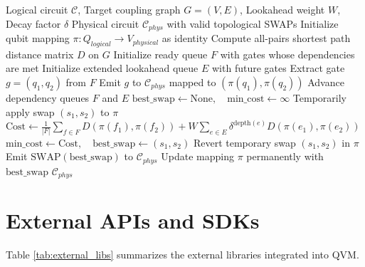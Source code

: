 \begin{algorithm}[H]
\caption{SABRE Routing with Decay-Weighted Lookahead}
\label{alg:sabre}
\begin{algorithmic}[1]
\Require Logical circuit $\mathcal{C}$, Target coupling graph $G=(V, E)$, Lookahead weight $W$, Decay factor $\delta$
\Ensure Physical circuit $\mathcal{C}_{phys}$ with valid topological SWAPs
\State Initialize qubit mapping $\pi: Q_{logical} \to V_{physical}$ as identity
\State Compute all-pairs shortest path distance matrix $D$ on $G$
\State Initialize ready queue $F$ with gates whose dependencies are met
\State Initialize extended lookahead queue $E$ with future gates
    \State Extract gate $g = (q_1, q_2)$ from $F$
        \State Emit $g$ to $\mathcal{C}_{phys}$ mapped to $(\pi(q_1), \pi(q_2))$
        \State Advance dependency queues $F$ and $E$
    \Else
        \State $\text{best\_swap} \leftarrow \text{None}, \quad \text{min\_cost} \leftarrow \infty$
            \State Temporarily apply swap $(s_1, s_2)$ to $\pi$
            \State $\text{Cost} \leftarrow \frac{1}{|F|}\sum_{f \in F} D(\pi(f_1), \pi(f_2)) + W \sum_{e \in E} \delta^{\text{depth}(e)} D(\pi(e_1), \pi(e_2))$
                \State $\text{min\_cost} \leftarrow \text{Cost}, \quad \text{best\_swap} \leftarrow (s_1, s_2)$
            \EndIf
            \State Revert temporary swap $(s_1, s_2)$ in $\pi$
        \EndFor
        \State Emit $\text{SWAP}(\text{best\_swap})$ to $\mathcal{C}_{phys}$
        \State Update mapping $\pi$ permanently with $\text{best\_swap}$
    \EndIf
\EndWhile
\State \Return $\mathcal{C}_{phys}$
\end{algorithmic}
\end{algorithm}

\section{External APIs and SDKs}
Table \ref{tab:external_libs} summarizes the external libraries integrated into QVM.

